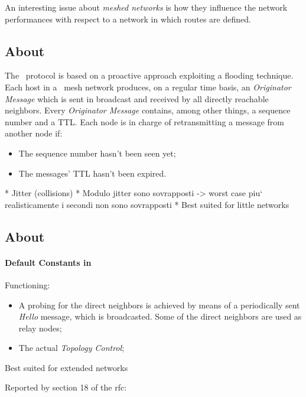 An interesting issue about \emph{meshed networks} is how they
influence the network performances with respect to a network in which
routes are defined.

\subsection{About \batman}

    The \batman\ protocol is based on a proactive approach exploiting a
    flooding technique. Each host in a \batman\ mesh network produces, on a
    regular time basis, an \emph{Originator Message} which is sent in
    broadcast and received by all directly reachable neighbors. Every
    \emph{Originator Message} contains, among other things, a sequence
    number and a TTL. Each node is in charge of retransmitting a message
    from another node if:
    \begin{itemize}
    \item   The sequence number hasn't been seen yet;
    \item   The messages' TTL hasn't been expired.
    \end{itemize}

    * Jitter (collisions)
    * Modulo jitter sono sovrapposti -> worst case
        piu` realisticamente i secondi non sono sovrapposti
    * Best suited for little networks

\subsection{About \olsr}

    \paragraph{Default Constants in \olsr}

        Functioning:
        \begin{itemize}
        \item   A probing for the direct neighbors is achieved by means of
                a periodically sent \emph{Hello} message, which is
                broadcasted. Some of the direct neighbors are used as
                relay nodes;
        \item   The actual \emph{Topology Control};
        \end{itemize}

        Best suited for extended networks

        Reported by section 18 of the rfc:

